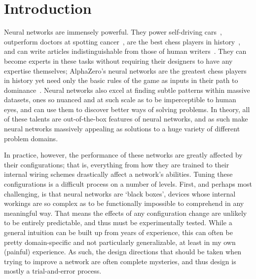 
\graphicspath{{Chapters/introduction/figures/}}

\chapter{Introduction}
Neural networks are immensely powerful. They power self-driving cars~\citep{KarpathySite},
 outperform doctors at spotting cancer~\citep{walsh2020}, are the best chess players in history~\citep{silver2018}, and
can write articles indistinguishable from those of human writers~\citep{brown2020}. They can become experts in these tasks without
requiring their designers to have any expertise themselves; AlphaZero's neural networks are the greatest
chess players in history yet need only the basic rules of the game as inputs in their path to dominance~\citep{silver2018}.
Neural networks also excel at finding subtle patterns within massive datasets, ones so nuanced and at such scale as to be imperceptible to human eyes,
and can use them to discover better ways of solving problems. In theory, all of these talents are out-of-the-box features
of neural networks, and as such make neural networks massively appealing as solutions to a huge variety of different problem domains.

In practice, however, the performance of these networks are greatly affected by their configurations; that is,
everything from how they are trained to their internal wiring schemes drastically affect a network's abilities. Tuning these
configurations is a difficult process on a number of levels. First, and perhaps most challenging, is that neural networks
are `black boxes', devices whose internal workings are so complex as to be functionally impossible to comprehend in
any meaningful way. That means the effects of any configuration change are unlikely to be entirely predictable, and thus
must be experimentally tested. While a general intuition can be built up from years of experience, this
can often be pretty domain-specific and not particularly generalizable, at least in my own (painful) experience. As such,
the design directions that should be taken when trying to improve a network are often complete mysteries, and thus design
is mostly a trial-and-error process.

